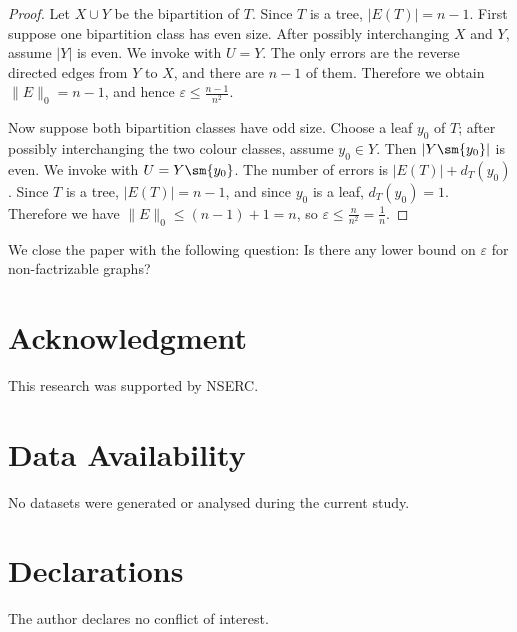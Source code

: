 \documentclass{file}
\newcommand{\eps}{\varepsilon}
\begin{document}
\begin{proof}
Let $X\cup Y$ be the bipartition of $T$.  Since $T$ is a tree, $|E(T)|=n-1$.
First suppose one bipartition class has even size.  After possibly interchanging $X$ and $Y$, assume $|Y|$ is even.  
We invoke  with $U=Y$.
The only errors are the reverse directed edges from $Y$ to $X$, and there are $n-1$ of them.  
Therefore we obtain  $\|E\|_0=n-1$,
and hence $\eps\le \frac{n-1}{n^2}$.

Now suppose both bipartition classes have odd size.  Choose a leaf $y_0$ of
$T$; after possibly interchanging the two colour classes, assume $y_0\in Y$.
Then $|Y\sm  \{y_0\}|$ is even.  
We invoke  with $U=Y\sm  \{y_0\}$.
The number of errors is $|E(T)|+d_T(y_0)$.
Since $T$ is a tree, $|E(T)|=n-1$, and since $y_0$ is a leaf, $d_T(y_0)=1$.
Therefore we have $\|E\|_0\le (n-1)+1=n$,
so $\eps\le \frac{n}{n^2}=\frac{1}{n}$.
\end{proof}

We close the paper with the following question:
Is there any lower bound on $\varepsilon$ for non-factrizable graphs?

\section*{Acknowledgment}

This research was supported by NSERC.

\section*{Data Availability}

No datasets were generated or analysed during the current study.

\section*{Declarations}

The author declares no conflict of interest.



\end{document}
